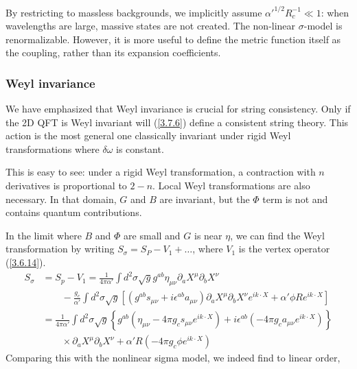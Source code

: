 By restricting to massless backgrounds, we implicitly assume $\alpha'^{1/2} R_c^{-1} \ll 1$: when wavelengths are large, massive states are not created. The non-linear $\sigma$-model is renormalizable. However, it is more useful to define the metric function itself as the coupling, rather than its expansion coefficients.

\subsubsection*{\Large Weyl invariance}

We have emphasized that Weyl invariance is crucial for string consistency. Only if the 2D QFT is Weyl invariant will (\ref{3.7.6}) define a consistent string theory. This action is the most general one classically invariant under rigid Weyl transformations where $\delta \omega$ is constant.

This is easy to see: under a rigid Weyl transformation, a contraction with $n$ derivatives is proportional to $2-n$. Local Weyl transformations are also necessary. In that domain, $G$ and $B$ are invariant, but the $\Phi$ term is not and contains quantum contributions.

In the limit where $B$ and $\Phi$ are small and $G$ is near $\eta$, we can find the Weyl transformation by writing $S_\sigma = S_P - V_1 + \dots$, where $V_1$ is the vertex operator (\ref{3.6.14}).
\begin{align}
	S_\sigma &= S_p - V_1 = \frac{1}{4\pi\alpha'} \int d^2\sigma \sqrt{g} g^{ab} \eta_{\mu\nu} \partial_a X^\mu \partial_b X^\nu\nonumber\\
	&\qquad- \frac{g_c}{\alpha'} \int d^2\sigma \sqrt{g} \left[ (g^{ab} s_{\mu\nu} + i\epsilon^{ab} a_{\mu\nu}) \partial_a X^\mu \partial_b X^\nu e^{ik\cdot X} + \alpha' \phi R e^{ik\cdot X} \right]\nonumber\\
	&= \frac{1}{4\pi\alpha'} \int d^2\sigma \sqrt{g} \left\{ g^{ab} \left( \eta_{\mu\nu} - 4\pi g_c s_{\mu\nu} e^{ik\cdot X} \right) + i\epsilon^{ab} \left( -4\pi g_c a_{\mu\nu} e^{ik\cdot X} \right) \right\}\nonumber\\
	&\qquad\times \partial_a X^\mu \partial_b X^\nu + \alpha' R \left( -4\pi g_c \phi e^{ik\cdot X} \right)
\end{align}
Comparing this with the nonlinear sigma model, we indeed find to linear order,

